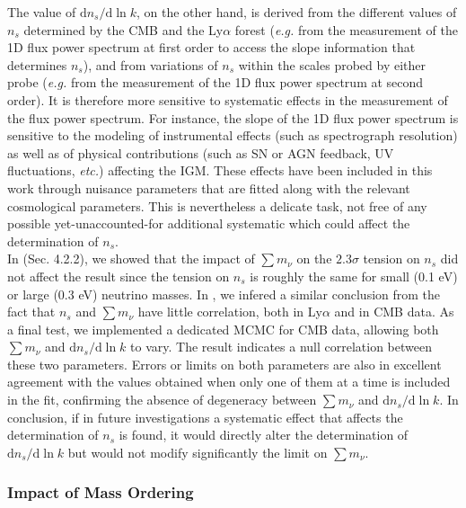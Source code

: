 The value of ${\mathrm d}n_s/{\mathrm d}\ln k$, on the other hand, is derived from the different values of $n_s$ determined by the CMB and the Ly$\alpha$ forest (\textit{e.g.} from the measurement of the 1D flux power spectrum at first order to access the slope information that determines $n_s$), and from variations of $n_s$ within the scales probed by either  probe (\textit{e.g.} from the measurement of the 1D flux power spectrum at second order). It is therefore more sensitive to systematic effects  in the measurement of the flux power spectrum. 
For instance, the slope of the 1D flux power spectrum is sensitive to  the modeling of  instrumental effects (such as spectrograph resolution) as well as of physical contributions (such as SN or AGN feedback, UV fluctuations, \textit{etc.}) affecting the IGM.  These effects have been included in this work through nuisance parameters that are fitted along with the relevant cosmological parameters. This is nevertheless a delicate task, not free of any possible yet-unaccounted-for additional systematic which could affect the determination of $n_s$. \\

In \cite{Palanque2015a} (Sec. 4.2.2), we showed that the impact of $\sum m_\nu$ on the $2.3\sigma$ tension on $n_s$ did not affect the result since the tension on $n_s$ is roughly the same for small (0.1 eV) or large (0.3 eV) neutrino masses. In \cite{Palanque2015b}, we infered a similar conclusion from the fact that $n_s$ and $\sum m_\nu$ have little correlation, both in Ly$\alpha$ and in CMB data. As a final test, we implemented a dedicated MCMC for CMB data, allowing both $\sum m_\nu$ and ${\mathrm d}n_s/{\mathrm d}\ln k$ to vary. The result indicates a null correlation between these two parameters. Errors or limits on both parameters are also in excellent agreement with the values obtained when only one of them at a time is included in the fit, confirming the absence of degeneracy between $\sum m_\nu$ and ${\mathrm d}n_s/{\mathrm d}\ln k$. 
In conclusion, if in future investigations a systematic effect that affects the determination of $n_s$ is found, it would directly alter the determination of ${\mathrm d}n_s/{\mathrm d}\ln k$ but would not modify significantly  the limit on $\sum m_\nu$.





\subsubsection{Impact of Mass Ordering}
\label{sec:ordering_impact}

